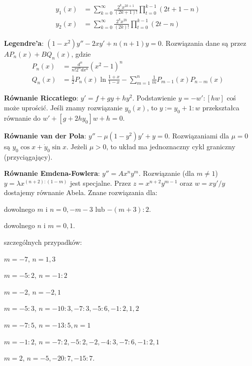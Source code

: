 \begin{multicols*}{2}
\begin{enumx}
\begin{align*}
y_1(x) & = \sum_{k=0}^\infty \frac{2^k x^{2k+1}}{(2k+1)!} \prod_{t=0}^{k-1} (2t+1-n)  \\
y_2(x) & = \sum_{k=0}^\infty \frac{2^k x^{2k}}{(2k)!} \prod_{t=0}^{k-1} (2t-n)
\end{align*}
\item \textbf{Legendre'a}: $(1-x^2)y'' - 2xy' + n(n+1) y = 0$.
Rozwiązania dane są przez $A P_n(x) + BQ_n(x)$, gdzie
\begin{align*}
P_n(x) & = \frac{d^n}{n! 2^n dx^n} (x^2-1)^n\\
Q_n(x) & = \frac 12 P_n(x) \ln \frac{1+x}{1-x} - \sum_{m =1}^n \frac 1 m P_{m-1}(x) P_{n-m}(x)
\end{align*}
\item \textbf{Równanie Riccatiego}: $y' = f + g y + h y^2$.
Podstawienie $y = - w' : [h w ]$ coś może uprościć.
Jeśli znamy rozwiązanie $y_0(x)$, to $y := y_0 + 1 : w$
przekształca równanie do $w' + [g + 2h y_0] w + h = 0$.
\item \textbf{Równanie van der Pola}: $y'' - \mu(1 - y^2) y' + y = 0$.
Rozwiązaniami dla $\mu = 0$ są $y_0 \cos x + \dot y_0 \sin x$.
Jeżeli $\mu > 0$, to układ ma jednoznaczny cykl graniczny (przyciągający).
\item \textbf{Równanie Emdena-Fowlera}: $y'' = Ax^n y^m$.
Rozwiązanie (dla $m \neq 1$) $y = \lambda x^{(n+2):(1-m)}$ jest specjalne.
Przez $z = x^{n+2} y^{m-1}$ oraz $w = xy'/y$ dostajemy równanie Abela.
Znane rozwiązania dla:
\begin{enumx}
\item dowolnego $m$ i $n = 0, -m-3$ lub $-(m+3):2$.
\item dowolnego $n$ i $m = 0, 1$.
\item szczególnych przypadków:
\begin{enumx}
\item $m = -7$, $n = 1, 3$
\item $m = -5:2$, $n = -1:2$
\item $m = -2$, $n = -2, 1$
\item $m = - 5:3$, $n = -10:3, -7:3, -5:6, -1:2, 1, 2$
\item $m = -7:5$, $n = -13:5, n = 1$
\item $m = -1:2$, $n = -7:2, -5:2, -2, -4:3, -7:6, -1:2, 1$
\item $m = 2$, $n = -5, -20:7, -15:7$.
\end{enumx}
\end{enumx}
\end{enumx}


\end{multicols*}
